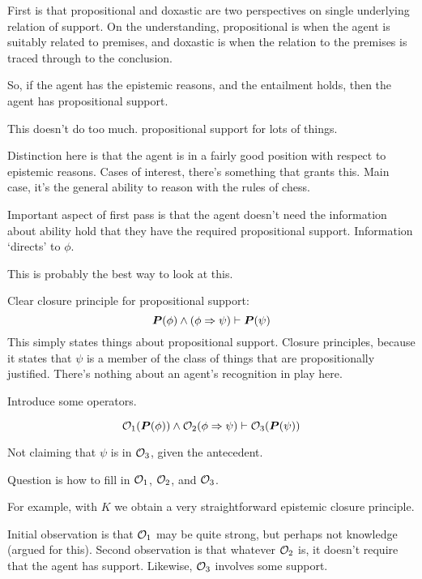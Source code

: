 {
  \begin{note}[Support]
    First is that propositional and doxastic are two perspectives on single underlying relation of support.
    On the understanding, propositional is when the agent is suitably related to premises, and doxastic is when the relation to the premises is traced through to the conclusion.

    So, if the agent has the epistemic reasons, and the entailment holds, then the agent has propositional support.

    This doesn't do too much.
    propositional support for lots of things.

    Distinction here is that the agent is in a fairly good position with respect to epistemic reasons.
    Cases of interest, there's something that grants this.
    Main case, it's the general ability to reason with the rules of chess.

    Important aspect of first pass is that the agent doesn't need the information about ability hold that they have the required propositional support.
    Information `directs' to \(\phi\).
  \end{note}

  \begin{note}
    This is probably the best way to look at this.

    Clear closure principle for propositional support:
    \[\bm{P}(\phi) \land (\phi \Rightarrow{} \psi) \vdash \bm{P}(\psi)\]
    This simply states things about propositional support.
    Closure principles, because it states that \(\psi\) is a member of the class of things that are propositionally justified.
    There's nothing about an agent's recognition in play here.

    Introduce some operators.

    \[\mathcal{O}_{1}(\bm{P}(\phi)) \land \mathcal{O}_{2}(\phi \Rightarrow{} \psi) \vdash \mathcal{O}_{3}(\bm{P}(\psi))\]

    Not claiming that \(\psi\) is in \(\mathcal{O}_{3}\), given the antecedent.

    Question is how to fill in \(\mathcal{O}_{1}\), \(\mathcal{O}_{2}\), and \(\mathcal{O}_{3}\).

    For example, with \(K\) we obtain a very straightforward epistemic closure principle.

    Initial observation is that \(\mathcal{O}_{1}\) may be quite strong, but perhaps not knowledge (argued for this).
    Second observation is that whatever \(\mathcal{O}_{2}\) is, it doesn't require that the agent has support.
    Likewise, \(\mathcal{O}_{3}\) involves some support.


\end{note}}
